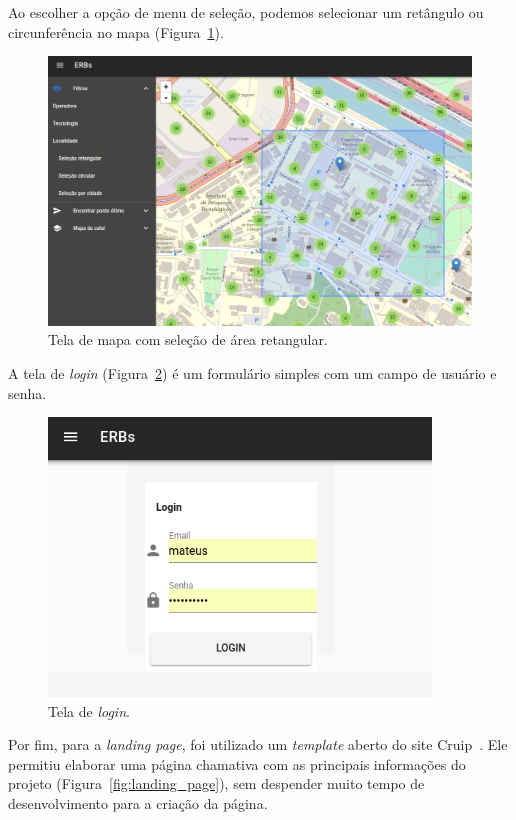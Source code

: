 \documentclass[]{politex}
\begin{document}
Ao escolher a opção de menu de seleção, podemos selecionar um retângulo ou
circunferência no mapa (Figura~\ref{fig:tela_mapas_retangulo}).

\begin{figure}[H]
    \centering
    \includegraphics[width=6in]{imagens/tela-mapas-retangulo}
    \caption{Tela de mapa com seleção de área retangular.}
    \label{fig:tela_mapas_retangulo}
\end{figure}

A tela de \textit{login} (Figura~\ref{fig:tela_login}) é um formulário simples
com um campo de usuário e senha.

\begin{figure}[H]
    \centering
    \includegraphics[width=4in]{imagens/tela-login}
    \caption{Tela de \textit{login}.}
    \label{fig:tela_login}
\end{figure}

Por fim, para a \textit{landing page}, foi utilizado um \textit{template} aberto
do site Cruip~\cite{cruip}. Ele permitiu elaborar uma página chamativa com as
principais informações do projeto (Figura~\ref{fig:landing_page}), sem despender
muito tempo de desenvolvimento para a criação da página.
\end{document}
